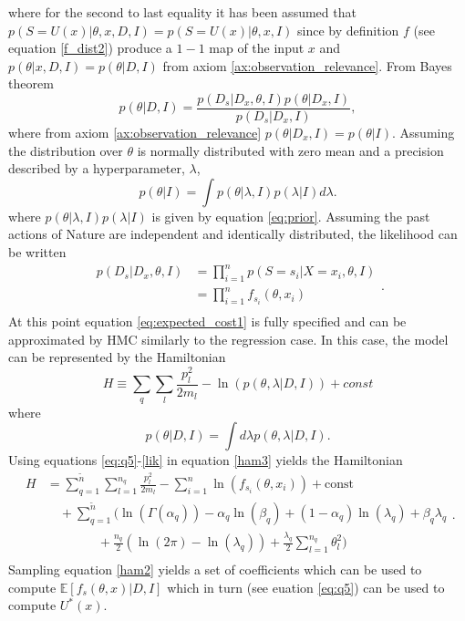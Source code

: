 where for the second to last equality it has been assumed that $p(S = U(x)|\theta,x,D,I) = p(S = U(x)|\theta,x,I)$ since by definition $f$ (see equation \eqref{f_dist2}) produce a $1-1$ map of the input $x$ and $p(\theta|x,D,I) = p(\theta|D,I)$ from axiom \ref{ax:observation_relevance}. From Bayes theorem
\begin{equation}
	p(\theta|D,I) =\frac{p(D_s|D_x,\theta,I)p(\theta|D_x,I)}{p(D_s|D_x,I)},
\end{equation}
where from axiom \ref{ax:observation_relevance} $p(\theta|D_x,I) = p(\theta|I)$. Assuming the distribution over $\theta$ is normally distributed with zero mean and a precision described by a hyperparameter, $\lambda$, 
\begin{equation}
	p(\theta|I) = \int p(\theta|\lambda,I)p(\lambda|I)d\lambda.
\end{equation}
where $p(\theta|\lambda,I)p(\lambda|I)$ is given by equation \eqref{eq:prior}. Assuming the past actions of Nature are independent and identically distributed, the likelihood can be written~\citep{Fischer1999} 
\begin{equation}
	\begin{split}
		p(D_s|D_x,\theta,I) &=\prod_{i=1}^{n}p(S = s_i|X = x_i,\theta,I)\\
		&=\prod_{i=1}^{n}f_{s_i}(\theta,x_i)\\
	\end{split}.
	\label{lik}
\end{equation}
At this point equation \eqref{eq:expected_cost1} is fully specified and can be approximated by HMC similarly to the regression case. In this case, the model can be represented by the Hamiltonian 
\begin{equation}
	H \equiv  \sum_{q}\sum_{l}\frac{p_{l}^2}{2m_{l}}-\ln(p(\theta,\lambda|D,I))+const
	\label{ham3}
\end{equation}
where
\begin{equation}
	p(\theta|D,I) = \int d\lambda p(\theta,\lambda|D,I).
\end{equation}
Using equations \eqref{eq:q5}-\eqref{lik} in equation \eqref{ham3} yields the Hamiltonian
\begin{equation}
	\begin{split}
		H&=\sum_{q=1}^{\tilde{n}}\sum_{l=1}^{n_q}\frac{p_{l}^2}{2m_{l}}-\sum_{i=1}^{n}\ln(f_{s_i}(\theta,x_i))+\text{const}\\
		&\quad+\sum_{q=1}^{\tilde{n}}\bigg(\ln(\Gamma(\alpha_q))-\alpha_q\ln(\beta_q)+(1-\alpha_q)\ln(\lambda_q)+\beta_q\lambda_q\\
		&\qquad \qquad+\frac{n_q}{2}(\ln(2\pi)-\ln(\lambda_q))+\frac{\lambda_q}{2}\sum_{l=1}^{n_q}\theta_l^2\bigg)\\
	\end{split}.
	\label{ham2}
\end{equation}
Sampling equation \eqref{ham2} yields a set of coefficients which can be used to compute $\mathbb{E}[f_s(\theta,x)|D,I]$ which in turn (see euation \eqref{eq:q5}) can be used to compute $U^*(x)$.